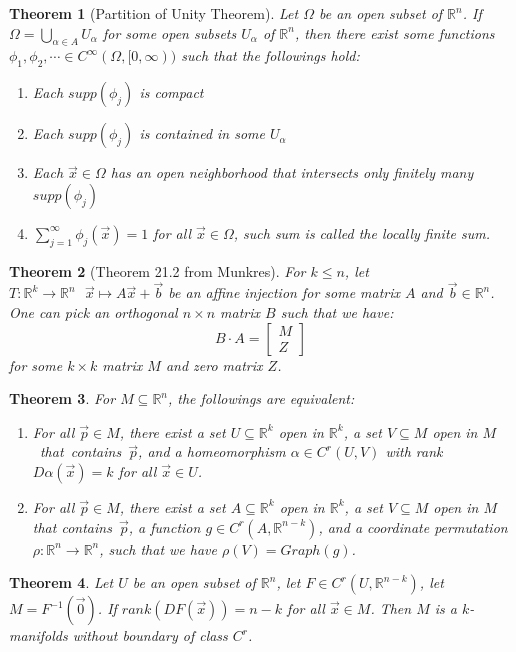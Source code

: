 \documentclass[11pt]{article}
\theoremstyle{break}
\theoremstyle{break}
\newtheorem{thm}{Theorem}[section]
\newcommand{\R}{\mathbb{R}}
\newcommand{\bmat}[1]{\begin{bmatrix}#1 \end{bmatrix}}
\begin{document}
\begin{thm}[Partition of Unity Theorem]
Let $\Omega$ be an open subset of $\R^n$. If $\Omega = \bigcup_{\alpha \in A} U_\alpha$ for some open subsets $U_\alpha$ of $\R^n$, then there exist some functions $\phi_1,\phi_2,\cdots \in C^\infty(\Omega, [0,\infty))$ such that the followings hold:
\begin{enumerate}[topsep=3pt,itemsep=-1ex,partopsep=1ex,parsep=1ex]
\item Each $supp(\phi_j)$ is compact
\item Each $supp(\phi_j)$ is contained in some $U_\alpha$
\item Each $\vec{x}\in \Omega$  has an open neighborhood that intersects only finitely many $supp(\phi_j)$
\item $\sum_{j=1}^\infty \phi_j(\vec{x}) = 1$ for all $\vec{x}\in \Omega$, such sum is called the locally finite sum.
\end{enumerate}
\end{thm}

\begin{thm}[Theorem 21.2 from Munkres] 
For $k\leq n$, let $T:\R^k \to \R^n \ \ \ \vec{x} \mapsto A\vec{x}+\vec{b}$ be an affine injection for some matrix $A$ and $\vec{b}\in \R^n$.\\ One can pick an orthogonal $n \times n$ matrix $B$ such that we have: $$B\cdot A= \bmat{M \\ Z}$$ for some $k\times k$ matrix $M$ and zero matrix $Z$.
\end{thm}

\begin{thm}
For $M \subseteq  \R^n$, the followings are equivalent:
\begin{enumerate}[topsep=3pt,itemsep=-1ex,partopsep=1ex,parsep=1ex]
\item For all $\vec{p}\in M$, there exist a set $U\subseteq \R^k$ open in $\R^k$, a set $V \subseteq M$ open in \mbox{$M$ that contains $\vec{p}$,} and a homeomorphism $\alpha \in C^r(U,V)$ with rank $D\alpha(\vec{x}) = k$ for all $\vec{x}\in U$.  
\item For all $\vec{p}\in M$, there exist a set $A \subseteq \R^k$ open in $\R^k$, a set $V\subseteq M$ open in $M$ that \mbox{contains $\vec{p}$,} a function $g\in C^r(A,\R^{n-k})$, and a coordinate permutation $\rho:\R^n \to \R^n$, such that we have $\rho(V) = Graph(g)$.  
\end{enumerate}
\end{thm}

\begin{thm}
Let $U$ be an open subset of $\R^n$, let $F \in C^r(U,\R^{n-k})$, let $M = F^{-1}(\vec{0})$. If $rank(DF(\vec{x})) = n-k$ for all $\vec{x}\in M$. Then $M$ is a $k$-manifolds without boundary of class $C^r$.
\end{thm}
\end{document}
